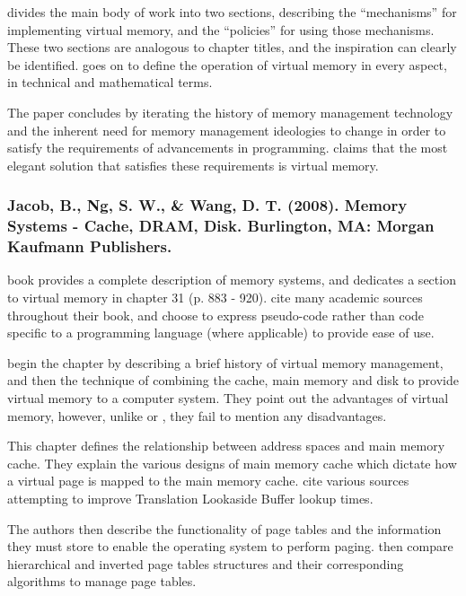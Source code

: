 \citet{Denning1970} divides the main body of work into two sections, describing the ``mechanisms'' for implementing virtual memory, and the ``policies'' for using those mechanisms. These two sections are analogous to  chapter titles, and the inspiration can clearly be identified. \citet{Denning1970} goes on to define the operation of virtual memory in every aspect, in technical and mathematical terms. 

The paper concludes by iterating the history of memory management technology and the inherent need for memory management ideologies to change in order to satisfy the requirements of advancements in programming. \citet{Denning1970} claims that the most elegant solution that satisfies these requirements is virtual memory.

\subsubsection*{Jacob, B., Ng, S. W., \& Wang, D. T. (2008). Memory Systems - Cache, DRAM, Disk. Burlington, MA: Morgan Kaufmann Publishers.}

 book provides a complete description of memory systems, and dedicates a section to virtual memory in chapter 31 (p. 883 - 920). \citet{Jacob2008} cite many academic sources throughout their book, and choose to express pseudo-code rather than code specific to a programming language (where applicable) to provide ease of use.

\citet{Jacob2008} begin the chapter by describing a brief history of virtual memory management, and then the technique of combining the cache, main memory and disk to provide virtual memory to a computer system. They point out the advantages of virtual memory, however, unlike \citet{Blanchet2012} or \citet{Blunden2003}, they fail to mention any disadvantages.

This chapter defines the relationship between address spaces and main memory cache. They explain the various designs of main memory cache which dictate how a virtual page is mapped to the main memory cache. \citet{Jacob2008} cite various sources attempting to improve Translation Lookaside Buffer lookup times.

The authors then describe the functionality of page tables and the information they must store to enable the operating system to perform paging. \citet{Jacob2008} then compare hierarchical and inverted page tables structures and their corresponding algorithms to manage page tables.

